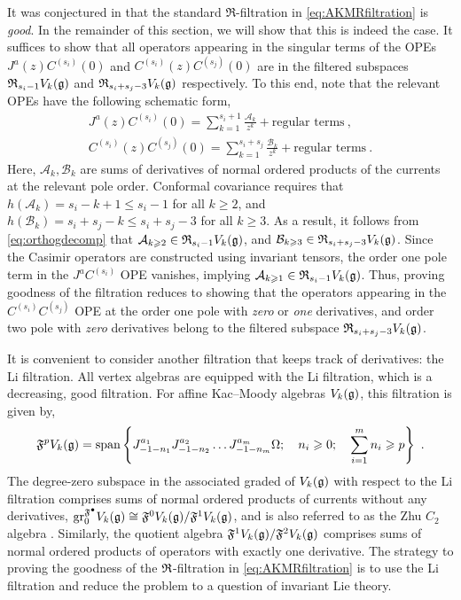 It was conjectured in \cite{ArabiArdehali:2025fad} that the standard $\mathfrak{R}$-filtration in \eqref{eq:AKMRfiltration} is \emph{good}. In the remainder of this section, we will show that this is indeed the case. It suffices to show that all operators appearing in the singular terms of the OPEs $J^a(z) C^{(s_i)}(0)$ and $C^{(s_i)}(z) C^{(s_j)}(0)$ are in the filtered subspaces  $\mathfrak{R}_{s_i-1} V_k(\mathfrak{g})$ and $\mathfrak{R}_{s_i+s_j-3} V_k(\mathfrak{g})$ respectively. To this end, note that the relevant OPEs have the following schematic form,
\begin{equation}
\begin{split}
    J^a(z) C^{(s_i)}(0) = \sum_{k = 1}^{s_i+1} \frac{\mathcal{A}_k}{z^k} + \text{regular terms}~, \\
    C^{(s_i)}(z) C^{(s_j)}(0) = \sum_{k = 1}^{s_i+s_j} \frac{\mathcal{B}_k}{z^k} + \text{regular terms}~.
\end{split}
\end{equation}
Here, $\mathcal{A}_k, \mathcal{B}_k$ are sums of derivatives of normal ordered products of the currents at the relevant pole order. Conformal covariance requires that $h(\mathcal{A}_k) = s_i-k+1 \leqslant s_i -1$ for all $k \geqslant 2$, and $h(\mathcal{B}_k) = s_i+s_j-k \leqslant s_i + s_j - 3$ for all $k \geqslant 3$. As a result, it follows from \eqref{eq:orthogdecomp} that $\mathcal{A}_{k \geqslant 2} \in \mathfrak{R}_{s_i - 1}V_k(\mathfrak{g})$, and $\mathcal{B}_{k \geqslant 3} \in \mathfrak{R}_{s_i + s_j -3}V_k(\mathfrak{g})$. Since the Casimir operators are constructed using invariant tensors, the order one pole term in the $J^aC^{(s_i)}$ OPE vanishes, implying $\mathcal{A}_{k \geqslant 1} \in \mathfrak{R}_{s_i - 1}V_k(\mathfrak{g})$. Thus, proving goodness of the filtration reduces to showing that the operators appearing in the $C^{(s_i)} C^{(s_j)}$ OPE at the order one pole with \emph{zero} or \emph{one} derivatives, and order two pole with \emph{zero} derivatives belong to the filtered subspace $\mathfrak{R}_{s_i + s_j -3}V_k(\mathfrak{g})$. 

It is convenient to consider another filtration that keeps track of derivatives: the Li filtration. All vertex algebras are equipped with the Li filtration, which is a decreasing, good filtration. For affine Kac--Moody algebras $V_k(\mathfrak{g})$, this filtration is given by,
\begin{equation}
    \mathfrak{F}^p V_k(\mathfrak{g})= \mathrm{span}\left\{ J^{a_1}_{-1-n_1} J^{a_2}_{-1-n_2} \ldots J^{a_m}_{-1-n_m} \Omega; \ \ \ n_i \geqslant 0; \ \ \ \sum_{i = 1}^{m} n_i \geqslant p \right\}~.
\end{equation}
The degree-zero subspace in the associated graded of $V_k(\mathfrak{g})$ with respect to the Li filtration comprises sums of normal ordered products of currents without any derivatives, $\mathrm{gr}_0^{\mathfrak{F}^\bullet} V_k(\mathfrak{g}) \cong \mathfrak{F}^0V_k(\mathfrak{g}) / \mathfrak{F}^1V_k(\mathfrak{g})$, and is also referred to as the Zhu $C_2$ algebra \cite{Zhu:1996gaq}. Similarly, the quotient algebra $\mathfrak{F}^1V_k(\mathfrak{g}) / \mathfrak{F}^2V_k(\mathfrak{g})$ comprises sums of normal ordered products of operators with exactly one derivative. The strategy to proving the goodness of the $\mathfrak{R}$-filtration in \eqref{eq:AKMRfiltration} is to use the Li filtration and reduce the problem to a question of invariant Lie theory. 

